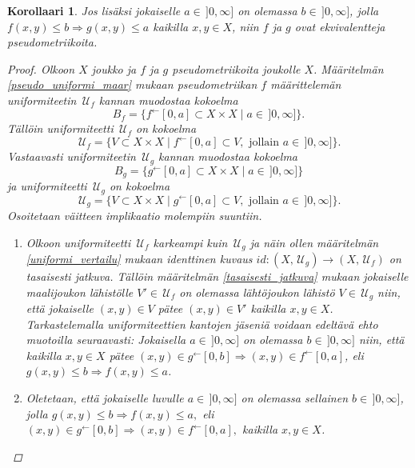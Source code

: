 \documentclass[12pt,a4paper,leqno]{report}
\newcommand{\U}{\,\mathcal{U}}
\theoremstyle{plain}
\newtheorem{kor}[equation]{Korollaari}
\theoremstyle{definition}
\theoremstyle{remark}
\begin{document}
\begin{kor}
Jos lisäksi jokaiselle $a\in\,]0,\infty]$ on olemassa $b\in\,]0,\infty]$, jolla $f(x,y)\leq b \Rightarrow g(x,y)\leq a$ kaikilla $x,y\in X$, niin $f$ ja $g$ ovat ekvivalentteja pseudometriikoita.
\begin{proof}
Olkoon $X$ joukko ja $f$ ja $g$ pseudometriikoita joukolle $X$. 
Määritelmän \ref{pseudo_uniformi_maar} mukaan pseudometriikan $f$ määrittelemän uniformiteetin $\U_f$ kannan muodostaa kokoelma 
$$B_f=\{ f^{\leftarrow}[0,a]\subset X\times X\mid a\in\,]0,\infty]\}.$$ 
Tällöin uniformiteetti $ \U_f$ on kokoelma 
$$\U_f=\{ V\subset X\times X\mid f^{\leftarrow}[0,a]\subset V, \text{ jollain } a\in\,]0,\infty]\}.$$
Vastaavasti uniformiteetin $\U_g$ kannan muodostaa kokoelma $$B_g=\{ g^{\leftarrow}[0,a]\subset X\times X\mid a\in\,]0,\infty]\}$$ ja uniformiteetti $ \U_g$ on kokoelma 
$$\U_g=\{ V\subset X\times X\mid g^{\leftarrow}[0,a]\subset V, \text{ jollain } a\in\,]0,\infty]\}.$$ 
Osoitetaan väitteen implikaatio molempiin suuntiin.
\begin{enumerate}
\item[$\Rightarrow$] 
Olkoon uniformiteetti $\U_f$ karkeampi kuin $\U_g$ ja näin ollen määritelmän \ref{uniformi_vertailu} mukaan identtinen kuvaus $id\colon(X,\U_g)\rightarrow(X,\U_f)$ on tasaisesti jatkuva. 
Tällöin määritelmän \ref{tasaisesti_jatkuva} 
mukaan jokaiselle maalijoukon %
lähistölle $V'\in\U_f $ on olemassa %
lähtöjoukon lähistö $V\in\U_g $ niin, että 
jokaiselle $(x,y)\in V$ pätee $(x,y)\in V'$ kaikilla $x,y\in X$. 
Tarkas\-tele\-mal\-la uniformiteettien kantojen jäseniä 
voidaan edeltävä ehto muotoilla seuraavasti: 
Jokaisella $a\in\,]0,\infty]$ on olemassa $b\in\,]0,\infty]$ niin, 
että kaikilla $x,y\in X$ pätee 
$(x,y)\in g^{\leftarrow}[0,b]\Rightarrow (x,y)\in f^{\leftarrow}[0,a]$, 
eli $g(x,y)\leq b\Rightarrow f(x,y) \leq a$.
\item[$\Leftarrow$] Oletetaan, että jokaiselle luvulle 
$a\in\,]0,\infty]$ on olemassa sellainen $b\in\,]0,\infty]$, jolla 
$g(x,y)\leq b \Rightarrow f(x,y)\leq a,
$ %
eli %
$(x,y)\in g^{\leftarrow}[0,b]\Rightarrow (x,y)\in f^{\leftarrow}[0,a],$ 
kaikilla $x,y\in X$. 
\\

\end{enumerate}
\end{proof}
\end{kor}
\end{document}
